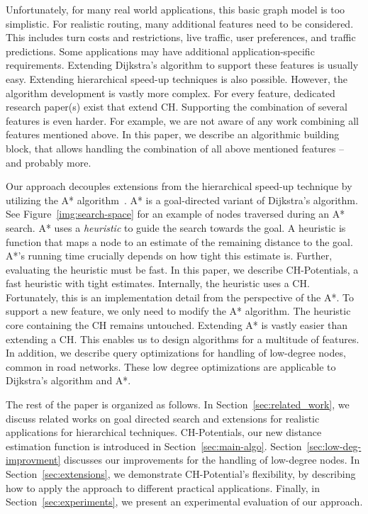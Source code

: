 \documentclass[manuscript,review]{acmart}
\begin{document}
Unfortunately, for many real world applications, this basic graph model is too simplistic.
For realistic routing, many additional features need to be considered.
This includes turn costs and restrictions, live traffic, user preferences, and traffic predictions. %
Some applications may have additional application-specific requirements.
Extending Dijkstra's algorithm to support these features is usually easy.
Extending hierarchical speed-up techniques is also possible.
However, the algorithm development is vastly more complex.
For every feature, dedicated research paper(s) exist that extend CH.
Supporting the combination of several features is even harder.
For example, we are not aware of any work combining all features mentioned above.
In this paper, we describe an algorithmic building block, that allows handling the combination of all above mentioned features -- and probably more.

Our approach decouples extensions from the hierarchical speed-up technique by utilizing the A* algorithm~\cite{hnr-afbhd-68}.
A* is a goal-directed variant of Dijkstra's algorithm.
See Figure~\ref{img:search-space} for an example of nodes traversed during an A* search.
A* uses a \emph{heuristic} to guide the search towards the goal.
A heuristic is function that maps a node to an estimate of the remaining distance to the goal.
A*'s running time crucially depends on how tight this estimate is.
Further, evaluating the heuristic must be fast.
In this paper, we describe CH-Potentials, a fast heuristic with tight estimates.
Internally, the heuristic uses a CH.
Fortunately, this is an implementation detail from the perspective of the A*.
To support a new feature, we only need to modify the A* algorithm.
The heuristic core containing the CH remains untouched.
Extending A* is vastly easier than extending a CH.
This enables us to design algorithms for a multitude of features.
In addition, we describe query optimizations for handling of low-degree nodes, common in road networks.
These low degree optimizations are applicable to Dijkstra's algorithm and A*.

The rest of the paper is organized as follows.
In Section~\ref{sec:related_work}, we discuss related works on goal directed search and extensions for realistic applications for hierarchical techniques.
CH-Potentials, our new distance estimation function is introduced in Section~\ref{sec:main-algo}.
Section~\ref{sec:low-deg-improvment} discusses our improvements for the handling of low-degree nodes.
In Section~\ref{sec:extensions}, we demonstrate CH-Potential's flexibility, by describing how to apply the approach to different practical applications.
Finally, in Section~\ref{sec:experiments}, we present an experimental evaluation of our approach.
\end{document}
